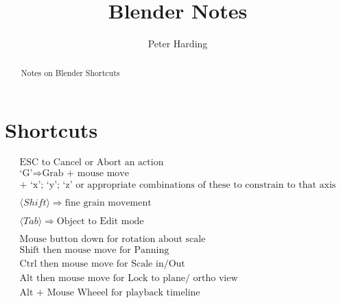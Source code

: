 \documentclass[]{article}
\title{Blender Notes}
\author{Peter Harding}
\begin{document}
\maketitle

\begin{abstract}
Notes on Blender Shortcuts
\end{abstract}

\section{Shortcuts}
\begin{align*}
	\text{ESC to Cancel or Abort an action} \\
\text{`G'} \Longrightarrow \text{Grab + mouse move} \\
\text{+ `x'; `y'; `z' or appropriate combinations of these to constrain to that axis} \\
\\
\langle Shift \rangle \Longrightarrow  \text{fine grain movement} \\
\\
\langle Tab \rangle \Longrightarrow  \text{Object to Edit mode} \\
\\
\text{Mouse button down for rotation about scale} \\
\text{Shift then mouse move for Panning} \\
\text{Ctrl then mouse move for Scale in/Out} \\
\text{Alt then mouse move for Lock to plane/ ortho view} \\
\text{Alt + Mouse Wheeel for playback timeline} \\
\end{align*}

\newpage
\end{document}
